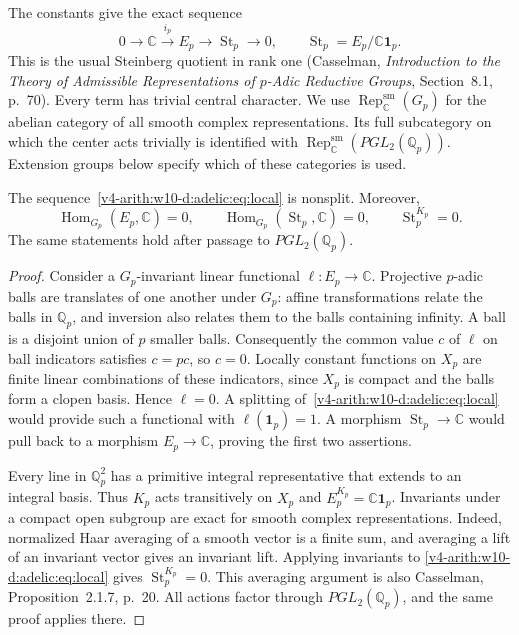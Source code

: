 The constants give the exact sequence
\begin{equation}\label{v4-arith:w10-d:adelic:eq:local}
 0\longrightarrow\mathbb C\xrightarrow{i_p}E_p
   \longrightarrow\operatorname{St}_p\longrightarrow0,
 \qquad \operatorname{St}_p=E_p/\mathbb C\mathbf1_p.
\end{equation}
This is the usual Steinberg quotient in rank one
(Casselman, \emph{Introduction to the Theory of Admissible Representations of $p$-Adic Reductive Groups}, Section~8.1, p.~70). Every term has trivial central character.
We use $\operatorname{Rep}^{\mathrm{sm}}_{\mathbb C}(G_p)$ for the abelian category of all smooth complex
representations. Its full subcategory on which the center acts trivially
is identified with $\operatorname{Rep}^{\mathrm{sm}}_{\mathbb C}(PGL_2(\mathbb Q_p))$. Extension groups below specify
which of these categories is used.

\begin{lemma}\label{v4-arith:w10-d:adelic:lem:local}
The sequence~\eqref{v4-arith:w10-d:adelic:eq:local} is nonsplit. Moreover,
\[
 \operatorname{Hom}_{G_p}(E_p,\mathbb C)=0,\qquad
 \operatorname{Hom}_{G_p}(\operatorname{St}_p,\mathbb C)=0,\qquad
 \operatorname{St}_p^{K_p}=0.
\]
The same statements hold after passage to $PGL_2(\mathbb Q_p)$.
\end{lemma}
\begin{proof}
Consider a $G_p$-invariant linear functional $\ell:E_p\to\mathbb C$.
Projective $p$-adic balls are translates of one another under $G_p$:
affine transformations relate the balls in $\mathbb Q_p$, and inversion also
relates them to the balls containing infinity. A ball is a disjoint union
of $p$ smaller balls. Consequently the common value $c$ of $\ell$ on
ball indicators satisfies $c=pc$, so $c=0$. Locally constant functions
on $X_p$ are finite linear combinations of these indicators, since $X_p$
is compact and the balls form a clopen basis. Hence $\ell=0$.
A splitting of~\eqref{v4-arith:w10-d:adelic:eq:local} would provide such a functional with
$\ell(\mathbf1_p)=1$. A morphism $\operatorname{St}_p\to\mathbb C$ would pull back to a
morphism $E_p\to\mathbb C$, proving the first two assertions.

Every line in $\mathbb Q_p^2$ has a primitive integral representative that extends
to an integral basis. Thus $K_p$ acts transitively on $X_p$ and
$E_p^{K_p}=\mathbb C\mathbf1_p$. Invariants under a compact open subgroup
are exact for smooth complex representations. Indeed, normalized Haar
averaging of a smooth vector is a finite sum, and averaging a lift of an
invariant vector gives an invariant lift. Applying invariants to
\eqref{v4-arith:w10-d:adelic:eq:local} gives $\operatorname{St}_p^{K_p}=0$. This averaging argument is also
Casselman, Proposition~2.1.7, p.~20.
All actions factor through $PGL_2(\mathbb Q_p)$, and the same proof applies there.
\end{proof}

